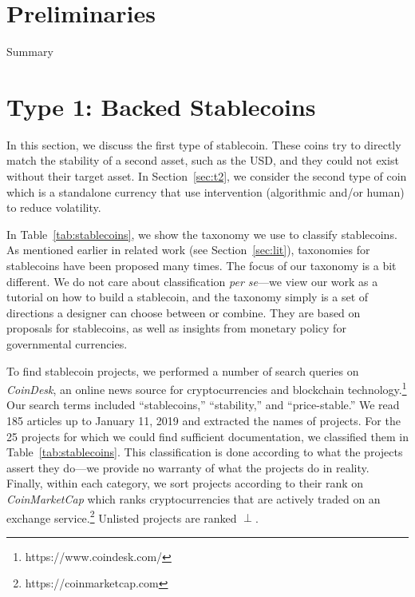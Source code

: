 \section{Preliminaries}

Summary



\section{Type 1: Backed Stablecoins}
\label{sec:t1}

In this section, we discuss the first type of stablecoin. These coins try to directly match the stability of a second asset, such as the USD, and they could not exist without their target asset. In Section~\ref{sec:t2}, we consider the second type of coin which is a standalone currency that use intervention (algorithmic and/or human) to reduce volatility.



In Table~\ref{tab:stablecoins}, we show the taxonomy we use to classify stablecoins. As mentioned earlier in related work (see Section~\ref{sec:lit}), taxonomies for stablecoins have been proposed many times. The focus of our taxonomy is a bit different. We do not care about classification \textit{per se}---we view our work as a tutorial on how to build a stablecoin, and the taxonomy simply is a set of directions a designer can choose between or combine. They are based on proposals for stablecoins, as well as insights from monetary policy for governmental currencies.

To find stablecoin projects, we performed a number of search queries on \textit{CoinDesk}, an online news source for cryptocurrencies and blockchain technology.\footnote{https://www.coindesk.com/} Our search terms included ``stablecoins,'' ``stability,'' and ``price-stable.'' We read 185 articles up to January 11, 2019 and extracted the names of projects. For the 25 projects for which we could find sufficient documentation, we classified them in Table~\ref{tab:stablecoins}. This classification is done according to what the projects assert they do---we provide no warranty of what the projects do in reality. Finally, within each category, we sort projects according to their rank on \textit{CoinMarketCap} which ranks cryptocurrencies that are actively traded on an exchange service.\footnote{https://coinmarketcap.com} Unlisted projects are ranked $\perp$.

